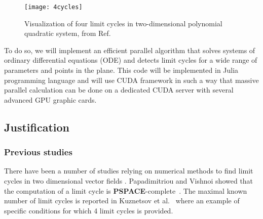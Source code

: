 \begin{figure}[H]
    \centering
    \texttt{[image: 4cycles]}
    \caption{Visualization of four limit cycles in two-dimensional polynomial quadratic system, from Ref.~\cite{kuznetsov_visualization_2013}
    }%
    \label{fig:kuznetsov}
\end{figure}

To do so, we will implement an efficient parallel algorithm that solves systems
of ordinary differential equations (ODE) and detects limit cycles for a wide
range of parameters and points in the plane.  This code will be implemented in
Julia programming language and will use CUDA framework in such a way that
massive parallel calculation can be done on a dedicated CUDA server with several
advanced GPU graphic cards.


\subsection{Justification}
\subsubsection{Previous studies}

There have been a number of studies relying on numerical methods to find limit
cycles in two dimensional vector fields
\cite{leonov_hidden_2013,van_der_hoff_numerical_2013,casades_computation_2013,gasull_effective_nodate}.
Papadimitriou and Vishnoi showed that the computation of a limit cycle is
\textbf{PSPACE}-complete~\cite{papadimitriou_computational_2015}.
The maximal known number of limit cycles is reported in Kuznetsov et
al.~\cite{kuznetsov_visualization_2013} where an example of specific conditions
for which 4 limit cycles is provided.


